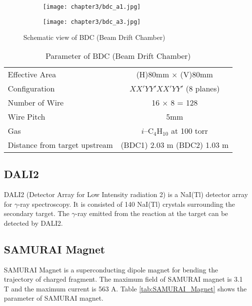 \begin{figure}[h]
    \centering
    \begin{subfigure}{\textwidth}
        \centering
        \texttt{[image: chapter3/bdc\_a1.jpg]}    
    \end{subfigure}
    \begin{subfigure}{\textwidth}
        \hspace{1.5cm}
        \texttt{[image: chapter3/bdc\_a3.jpg]}
    \end{subfigure}
    \caption{Schematic view of BDC (Beam Drift Chamber) \cite{SAMURAI}}
    \label{fig:BDC}
\end{figure}

\clearpage
\begin{table}
    \centering
    \begin{tabular}[h]{l|c}
        \hline
        Effective Area & (H)80mm $\times$ (V)80mm\\
        Configuration & $XX'YY'XX'YY'$ (8 planes)\\
        Number of Wire & 16 $\times$ 8 = 128 \\
        Wire Pitch & 5mm \\
        Gas & $i$--${\text{C}}_{4} {\text{H}}_{10}$ at 100 torr\\
        Distance from target upstream & (BDC1) 2.03 m (BDC2) 1.03 m \\
        \hline
    \end{tabular}
    \caption{Parameter of BDC (Beam Drift Chamber) \cite{SAMURAI}}
    \label{tab:BDC}
\end{table}

\subsection{DALI2}
DALI2 (Detector Array for Low Intensity radiation 2) is a NaI(Tl) detector array for $\gamma$-ray spectroscopy\cite{DALI2}. It is consisted of 140 NaI(Tl) crystals surrounding the secondary target. The $\gamma$-ray emitted from the reaction at the target can be detected by DALI2. 

\subsection{SAMURAI Magnet}
SAMURAI Magnet is a superconducting dipole magnet for bending the trajectory of charged fragment. The maximum field of SAMURAI magnet is 3.1 T and the maximum current is 563 A. Table \ref{tab:SAMURAI_Magnet} shows the parameter of SAMURAI magnet.

